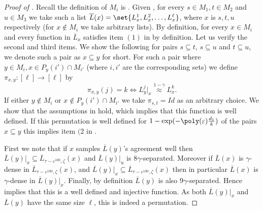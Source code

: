 \begin{proof}[Proof of ]
Recall the definition of \(M_i\) is . Given , for every \(s \in M_1, t \in M_2\) and \(u \in M_3\) we take such a list \(\overline{L}(x) = \set{L_x^1,L_x^2,\dots,L_x^\ell}\), where \(x\) is \(s,t,u\) respectively (for \(x \notin M_i\) we take arbitrary lists). By definition, for every \(x \in M_i\) and every function in \(\overline{L}_x\) satisfies item \((1)\) in  by definition. Let us verify the second and third items. We show the following for pairs \(s \subseteq t\), \(s \subseteq u\) and \(t \subseteq u\), we denote such a pair as \(x \subseteq y\) for short. For such a pair where \(y \in M_i, x \in P_y(i') \cap M_{i'}\) (where \(i,i'\) are the corresponding sets) we define \(\pi_{x,y}:[\ell]\to [\ell]\) by
\begin{equation} \label{eq:def-of-permutation}
    \pi_{x,y}(j)=k \Leftrightarrow L_y^j|_x \overset{1-\gamma}{\approx} L_x^k.
\end{equation} 
If either \(y \notin M_i\) or \(x \notin P_y(i')\cap M_{i'}\) we take \(\pi_{s,t}=Id\) as an arbitrary choice. We show that the assumptions in  hold, which implies that this function is well defined. If this permutation is well defined for \(1-\exp(-\poly(\varepsilon)\frac{d_1}{k})\) of the pairs \(x \subseteq y\) this implies item \((2\) in .

First we note that if \(x\) samples \(\overline{L}(y)\)'s agreement well then \(\overline{L}(y)|_x \subseteq \overline{L}_{\tau-\varepsilon^{100},\zeta}(x)\) and \(\overline{L}(y)|_u\) is \(8\gamma\)-separated. Moreover if \(\overline{L}(x)\) is \(\gamma\)-dense in \(\overline{L}_{\tau-\varepsilon^{100},\zeta}(x)\), and \(\overline{L}(y)|_x \subseteq \overline{L}_{\tau-\varepsilon^{100},\zeta}(x)\) then in particular \(\overline{L}(x)\) is \(\gamma\)-dense in \(\overline{L}(y)|_x\). Finally, by definition \(\overline{L}(y)\) is also \(9\gamma\)-separated. Hence  implies that this is a well defined and injective function. As both \(\overline{L}(y)|_x\) and \(\overline{L}(y)\) have the same size \(\ell\), this is indeed a permutation.


\end{proof}
